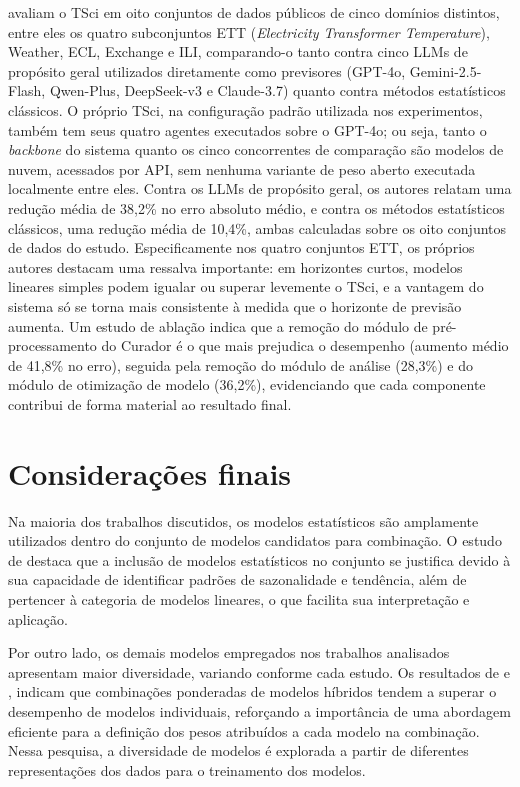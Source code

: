 \citet{zhao2025timeseriesscientist} avaliam o TSci em oito conjuntos de dados públicos de cinco domínios distintos, entre eles os quatro subconjuntos ETT (\textit{Electricity Transformer Temperature}), Weather, ECL, Exchange e ILI, comparando-o tanto contra cinco LLMs de propósito geral utilizados diretamente como previsores (GPT-4o, Gemini-2.5-Flash, Qwen-Plus, DeepSeek-v3 e Claude-3.7) quanto contra métodos estatísticos clássicos. O próprio TSci, na configuração padrão utilizada nos experimentos, também tem seus quatro agentes executados sobre o GPT-4o; ou seja, tanto o \textit{backbone} do sistema quanto os cinco concorrentes de comparação são modelos de nuvem, acessados por API, sem nenhuma variante de peso aberto executada localmente entre eles. Contra os LLMs de propósito geral, os autores relatam uma redução média de 38,2\% no erro absoluto médio, e contra os métodos estatísticos clássicos, uma redução média de 10,4\%, ambas calculadas sobre os oito conjuntos de dados do estudo. Especificamente nos quatro conjuntos ETT, os próprios autores destacam uma ressalva importante: em horizontes curtos, modelos lineares simples podem igualar ou superar levemente o TSci, e a vantagem do sistema só se torna mais consistente à medida que o horizonte de previsão aumenta. Um estudo de ablação indica que a remoção do módulo de pré-processamento do Curador é o que mais prejudica o desempenho (aumento médio de 41,8\% no erro), seguida pela remoção do módulo de análise (28,3\%) e do módulo de otimização de modelo (36,2\%), evidenciando que cada componente contribui de forma material ao resultado final.

\section{Considerações finais}
Na maioria dos trabalhos discutidos, os modelos estatísticos são amplamente utilizados dentro do conjunto de modelos candidatos para combinação. O estudo de \cite{demattos2019} destaca que a inclusão de modelos estatísticos no conjunto se justifica devido à sua capacidade de identificar padrões de sazonalidade e tendência, além de pertencer à categoria de modelos lineares, o que facilita sua interpretação e aplicação.

Por outro lado, os demais modelos empregados nos trabalhos analisados apresentam maior diversidade, variando conforme cada estudo. Os resultados de \cite{fforma2019} e \cite{ade}, indicam que combinações ponderadas de modelos híbridos tendem a superar o desempenho de modelos individuais, reforçando a importância de uma abordagem eficiente para a definição dos pesos atribuídos a cada modelo na combinação. Nessa pesquisa, a diversidade de modelos é explorada a partir de diferentes representações dos dados para o treinamento dos modelos.

